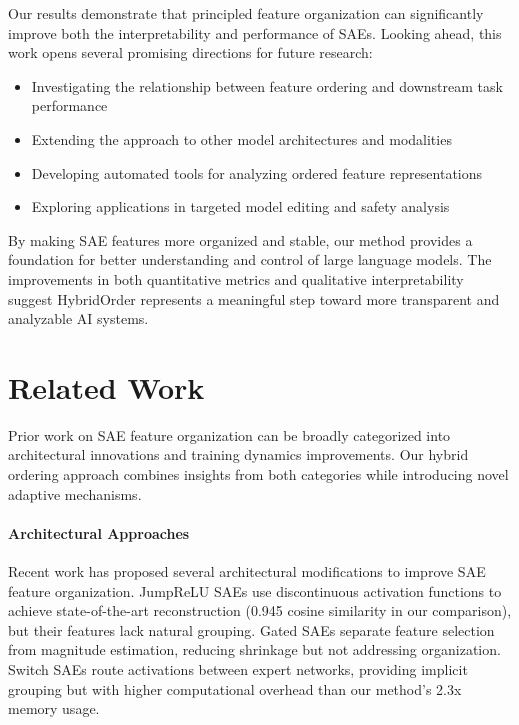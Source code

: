 \documentclass{article} %
\begin{document}
Our results demonstrate that principled feature organization can significantly improve both the interpretability and performance of SAEs. Looking ahead, this work opens several promising directions for future research:
\begin{itemize}
    \item Investigating the relationship between feature ordering and downstream task performance
    \item Extending the approach to other model architectures and modalities
    \item Developing automated tools for analyzing ordered feature representations
    \item Exploring applications in targeted model editing and safety analysis
\end{itemize}

By making SAE features more organized and stable, our method provides a foundation for better understanding and control of large language models. The improvements in both quantitative metrics and qualitative interpretability suggest HybridOrder represents a meaningful step toward more transparent and analyzable AI systems.

\section{Related Work}
\label{sec:related}

Prior work on SAE feature organization can be broadly categorized into architectural innovations and training dynamics improvements. Our hybrid ordering approach combines insights from both categories while introducing novel adaptive mechanisms.

\paragraph{Architectural Approaches} Recent work has proposed several architectural modifications to improve SAE feature organization. JumpReLU SAEs \cite{rajamanoharanJumpingAheadImproving2024} use discontinuous activation functions to achieve state-of-the-art reconstruction (0.945 cosine similarity in our comparison), but their features lack natural grouping. Gated SAEs \cite{rajamanoharanImprovingDictionaryLearning2024} separate feature selection from magnitude estimation, reducing shrinkage but not addressing organization. Switch SAEs \cite{mudideEfficientDictionaryLearning2024a} route activations between expert networks, providing implicit grouping but with higher computational overhead than our method's 2.3x memory usage.
\end{document}
